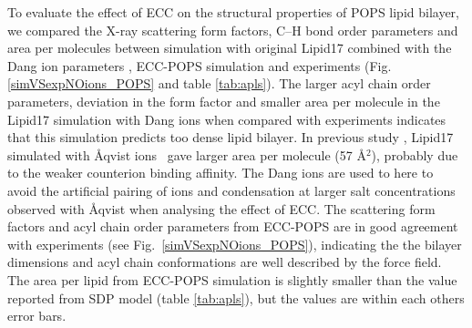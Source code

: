 \documentclass[journal=jpcbfk,manuscript=article]{achemso}
\begin{document}
To evaluate the effect of ECC on the structural properties of POPS lipid bilayer,
we compared the X-ray scattering form factors, C--H bond order parameters and area per molecules
between simulation with original Lipid17 \cite{??} combined with the Dang ion parameters \cite{??},
ECC-POPS simulation and experiments (Fig. \ref{simVSexpNOions_POPS} and table \ref{tab:apls}).
The larger acyl chain order parameters, deviation in the form factor and smaller area per molecule 
in the Lipid17 simulation with Dang ions when compared with experiments indicates that this simulation
predicts too dense lipid bilayer. In previous study \cite{nmrlipids_proj4}, Lipid17 simulated with {\AA}qvist ions~\cite{aqvist90}
gave larger area per molecule (57 \AA$^2$), probably due to the weaker counterion binding affinity.
The Dang ions are used to here to avoid the artificial pairing of ions and condensation at larger salt
concentrations observed with {\AA}qvist \cite{kohagen16, chen07, nmrlipids_proj4} when analysing the effect of ECC. 
The scattering form factors and acyl chain order parameters from ECC-POPS are in good agreement with
experiments (see Fig.~\ref{simVSexpNOions_POPS}), indicating the the bilayer dimensions and acyl chain
conformations are well described by the force field. The area per lipid from ECC-POPS simulation is slightly
smaller than the value reported from SDP model \cite{kucerka14} (table \ref{tab:apls}), but the values
are within each others error bars. 
\end{document}
